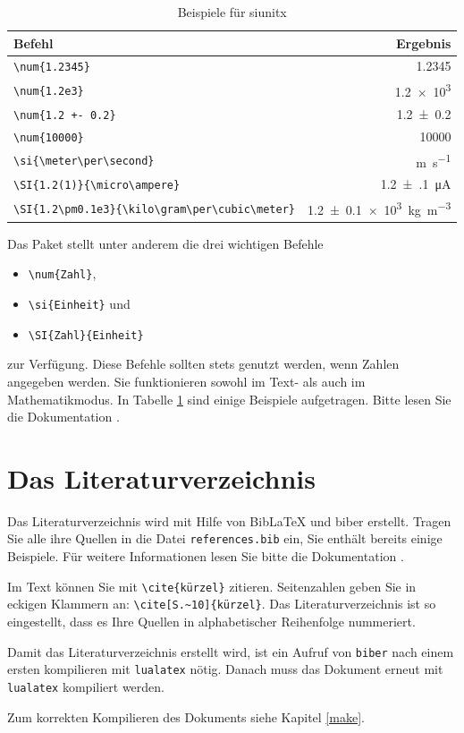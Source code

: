 \begin{table}[!h]
    \centering
    \caption{Beispiele für siunitx}
    \label{tab:si}
    \begin{tabular}{l r}
        \toprule
        Befehl     &   Ergebnis \\
        \midrule
        \verb+\num{1.2345}+ & \num{1.2345} \\
        \verb+\num{1.2e3}+ & \num{1.2e3} \\
        \verb_\num{1.2 +- 0.2}_ & \num{1.2+-0.2} \\
        \verb+\num{10000}+ & \num{10000} \\
        \verb+\si{\meter\per\second}+ & \si{\meter\per\second} \\
        \verb+\SI{1.2(1)}{\micro\ampere}+ & \SI{1.2(1)}{\micro\ampere} \\
        \verb+\SI{1.2\pm0.1e3}{\kilo\gram\per\cubic\meter}+ & \SI{1.2\pm0.1e3}{\kilo\gram\per\cubic\meter} \\
        \bottomrule 
    \end{tabular}
\end{table}

Das Paket stellt unter anderem die drei wichtigen Befehle
\begin{itemize}
    \item \texttt{\textbackslash num\{Zahl\}},
    \item \texttt{\textbackslash si\{Einheit\}} und
    \item \texttt{\textbackslash SI\{Zahl\}\{Einheit\}}
\end{itemize}
zur Verfügung.
Diese Befehle sollten stets genutzt werden, wenn Zahlen angegeben werden. 
Sie funktionieren sowohl im Text- als auch im Mathematikmodus.
In Tabelle \ref{tab:si} sind einige Beispiele aufgetragen. Bitte lesen Sie die Dokumentation \cite{siunitx}.

\section{Das Literaturverzeichnis}

Das Literaturverzeichnis wird mit Hilfe von BibLaTeX und biber erstellt.
Tragen Sie alle ihre Quellen in die Datei \texttt{references.bib} ein, Sie enthält bereits
einige Beispiele. Für weitere Informationen lesen Sie bitte die Dokumentation \cite{biblatex}.

Im Text können Sie mit \verb_\cite{kürzel}_ zitieren. Seitenzahlen geben Sie in eckigen Klammern an:
\verb_\cite[S.~10]{kürzel}_. Das Literaturverzeichnis ist so eingestellt, dass es Ihre Quellen in alphabetischer Reihenfolge nummeriert.

Damit das Literaturverzeichnis erstellt wird, ist ein Aufruf von \texttt{biber} nach einem ersten kompilieren mit \texttt{lualatex} nötig.
Danach muss das Dokument erneut mit \texttt{lualatex} kompiliert werden. 

Zum korrekten Kompilieren des Dokuments siehe Kapitel \ref{make}.
